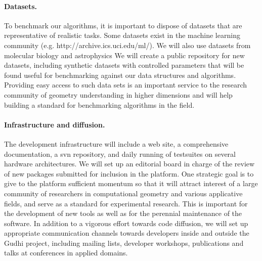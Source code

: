 \paragraph{Datasets.}
To benchmark our algorithms, it is important to dispose of datasets
that are representative of realistic tasks. Some datasets exist in the
machine learning community (e.g. http://archive.ics.uci.edu/ml/). We
will also use datasets from molecular biology and astrophysics  We
will create a public repository for new datasets, including synthetic
datasets with controlled parameters that will be found useful for
benchmarking against our data structures and algorithms. Providing easy
access to such data sets is an important service to the research
community of geometry understanding in higher dimensions and will help
building a standard for benchmarking algorithms in the field.


\paragraph{Infrastructure and diffusion.}
The development infrastructure will include a web site, a
comprehensive documentation, a svn repository, and daily running of
testsuites on several hardware architectures.  We will set up an
editorial board in charge of the review of new packages
submitted for inclusion in the platform.  One strategic goal is to
give to the platform sufficient momentum so that it will  attract
interest of a large community of researchers in computational geometry
and various applicative fields, and serve as a standard for
experimental research. This is important for the development of new
tools as well as for the perennial maintenance of the software. In
addition to a vigorous effort towards code diffusion, we will set up
appropriate communication channels towards developers inside and
outside the Gudhi project, including mailing lists, developer
workshops, publications and talks at conferences in applied domains.















